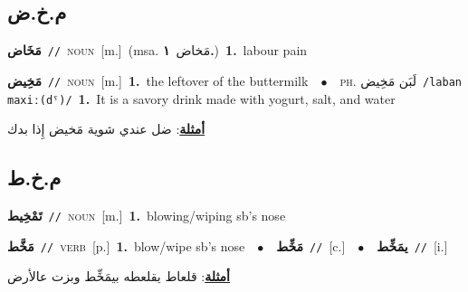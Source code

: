 \documentclass[10pt,a4paper,twoside]{article} %
\begin{document}
\begin{multicols}{2}
\vspace{-3mm}
\subsection*{\color{blue}\foreignlanguage{arabic}{م.خ.ض}\color{blue}{}} 

{\setlength\topsep{0pt}\textbf{\foreignlanguage{arabic}{مَخَاض}}\ {\color{gray}\texttt{//}\color{black}}\ \textsc{noun}\ [m.]\ \color{gray}(msa. \foreignlanguage{arabic}{مَخاض}~\foreignlanguage{arabic}{\textbf{١.}})\color{black}\ \textbf{1.}~labour pain\ } \vspace{2mm}

{\setlength\topsep{0pt}\textbf{\foreignlanguage{arabic}{مَخِيض}}\ {\color{gray}\texttt{//}\color{black}}\ \textsc{noun}\ [m.]\ \textbf{1.}~the leftover of the buttermilk\ \ $\bullet$\ \ \textsc{ph.} \color{gray} \foreignlanguage{arabic}{لَبَن مَخِيض}\color{black}\ {\color{gray}\texttt{/{\sffamily laban maxiː(dˤ)}/}\color{black}}\ \textbf{1.}~It is a savory drink made with yogurt, salt, and water\  \begin{flushright}\color{gray}\foreignlanguage{arabic}{\textbf{\underline{\foreignlanguage{arabic}{أمثلة}}}: ضل عندي شوية مَخيض إِذا بدك}\end{flushright}\color{black}} \vspace{2mm}

\vspace{-3mm}
\subsection*{\color{blue}\foreignlanguage{arabic}{م.خ.ط}\color{blue}{}} 

{\setlength\topsep{0pt}\textbf{\foreignlanguage{arabic}{تَمْخِيط}}\ {\color{gray}\texttt{//}\color{black}}\ \textsc{noun}\ [m.]\ \textbf{1.}~blowing/wiping sb's nose\ } \vspace{2mm}

{\setlength\topsep{0pt}\textbf{\foreignlanguage{arabic}{مَخَّط}}\ {\color{gray}\texttt{//}\color{black}}\ \textsc{verb}\ [p.]\ \textbf{1.}~blow/wipe sb's nose\ \ $\bullet$\ \ \setlength\topsep{0pt}\textbf{\foreignlanguage{arabic}{مَخِّط}}\ {\color{gray}\texttt{//}\color{black}}\ [c.]\ \ $\bullet$\ \ \setlength\topsep{0pt}\textbf{\foreignlanguage{arabic}{يمَخِّط}}\ {\color{gray}\texttt{//}\color{black}}\ [i.]\  \begin{flushright}\color{gray}\foreignlanguage{arabic}{\textbf{\underline{\foreignlanguage{arabic}{أمثلة}}}: قلعاط يقلعطه بيمَخِّط وبزت عالأرض}\end{flushright}\color{black}} \vspace{2mm}


\end{multicols}
\end{document}
